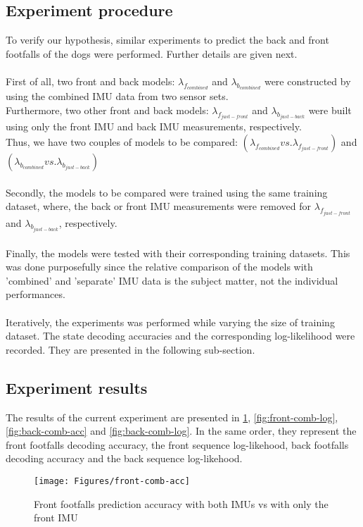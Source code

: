 \subsection{Experiment procedure}
To verify our hypothesis, similar experiments to predict the back and front footfalls of the dogs were performed. Further details are given next.\\\\
First of all, two front and back models: \(\lambda_{f_{combined}}\) and \(\lambda_{b_{combined}}\) were constructed by using the combined IMU data from two sensor sets.\\
Furthermore, two other front and back models: \(\lambda_{f_{just-front}}\) and \(\lambda_{b_{just-back}}\) were built using only the front IMU and back IMU measurements, respectively. \\Thus, we have two couples of models to be compared: \(( \lambda_{f_{combined}} vs. \lambda_{f_{just-front}})\) and \((\lambda_{b_{combined}} vs. \lambda_{b_{just-back}})\) \\\\
Secondly, the models to be compared were trained using the same training dataset, where, the back or front IMU measurements were removed for \(\lambda_{f_{just-front}}\) and \(\lambda_{b_{just-back}}\), respectively. \\\\
Finally, the models were tested with their corresponding training datasets. This was done purposefully since the relative comparison of the models with 'combined' and 'separate' IMU data is the subject matter, not the individual performances.\\\\
Iteratively, the experiments was performed while varying the size of training dataset. The state decoding accuracies and the corresponding log-likelihood were recorded. They are presented in the following sub-section.

\subsection{Experiment results}
The results of the current experiment are presented in \ref{fig:front-comb-acc}, \ref{fig:front-comb-log}, \ref{fig:back-comb-acc} and \ref{fig:back-comb-log}. In the same order, they represent the front footfalls decoding accuracy, the front sequence log-likehood,  back footfalls decoding accuracy and the back sequence log-likehood.

\begin{figure}[ht!]
	\texttt{[image: Figures/front-comb-acc]}
	\caption{Front footfalls prediction accuracy with both IMUs vs with only the front IMU}
	\label{fig:front-comb-acc}
\end{figure}

